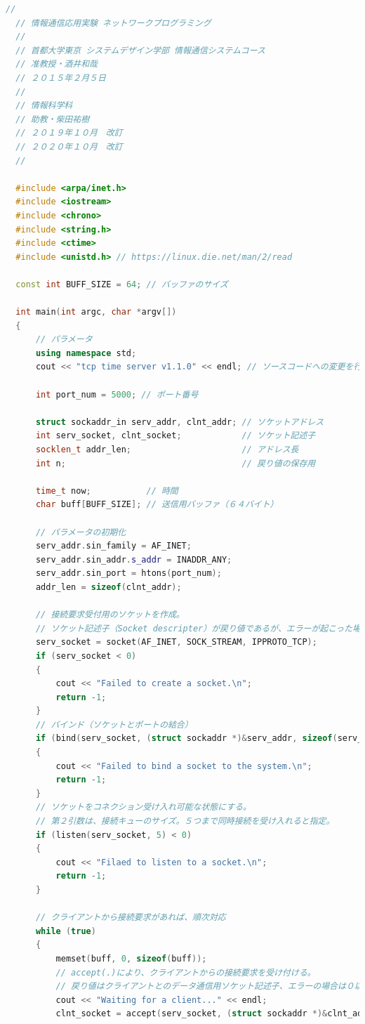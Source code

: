 \documentclass[fleqn, a4paper. 12pt]{ltjsarticle}
\begin{document}
\begin{lstlisting}[language=C++]
  //
  // 情報通信応用実験 ネットワークプログラミング
  //
  // 首都大学東京 システムデザイン学部 情報通信システムコース
  // 准教授・酒井和哉
  // ２０１５年２月５日
  //
  // 情報科学科
  // 助教・柴田祐樹
  // ２０１９年１０月　改訂
  // ２０２０年１０月　改訂
  //
  
  #include <arpa/inet.h>
  #include <iostream>
  #include <chrono>
  #include <string.h>
  #include <ctime>
  #include <unistd.h> // https://linux.die.net/man/2/read
  
  const int BUFF_SIZE = 64; // バッファのサイズ
  
  int main(int argc, char *argv[])
  {
      // パラメータ
      using namespace std;
      cout << "tcp time server v1.1.0" << endl; // ソースコードへの変更を行ったら数値を変える．
  
      int port_num = 5000; // ポート番号
  
      struct sockaddr_in serv_addr, clnt_addr; // ソケットアドレス
      int serv_socket, clnt_socket;            // ソケット記述子
      socklen_t addr_len;                      // アドレス長
      int n;                                   // 戻り値の保存用
  
      time_t now;           // 時間
      char buff[BUFF_SIZE]; // 送信用バッファ（６４バイト）
  
      // パラメータの初期化
      serv_addr.sin_family = AF_INET;
      serv_addr.sin_addr.s_addr = INADDR_ANY;
      serv_addr.sin_port = htons(port_num);
      addr_len = sizeof(clnt_addr);
  
      // 接続要求受付用のソケットを作成。
      // ソケット記述子（Socket descripter）が戻り値であるが、エラーが起こった場合は「-1」が返される。
      serv_socket = socket(AF_INET, SOCK_STREAM, IPPROTO_TCP);
      if (serv_socket < 0)
      {
          cout << "Failed to create a socket.\n";
          return -1;
      }
      // バインド（ソケットとポートの結合）
      if (bind(serv_socket, (struct sockaddr *)&serv_addr, sizeof(serv_addr)) < 0)
      {
          cout << "Failed to bind a socket to the system.\n";
          return -1;
      }
      // ソケットをコネクション受け入れ可能な状態にする。
      // 第２引数は、接続キューのサイズ。５つまで同時接続を受け入れると指定。
      if (listen(serv_socket, 5) < 0)
      {
          cout << "Filaed to listen to a socket.\n";
          return -1;
      }
  
      // クライアントから接続要求があれば、順次対応
      while (true)
      {
          memset(buff, 0, sizeof(buff));
          // accept(.)により、クライアントからの接続要求を受け付ける。
          // 戻り値はクライアントとのデータ通信用ソケット記述子、エラーの場合は０以下の値が返される。
          cout << "Waiting for a client..." << endl;
          clnt_socket = accept(serv_socket, (struct sockaddr *)&clnt_addr, &addr_len);
  

\end{lstlisting}
\end{document}
